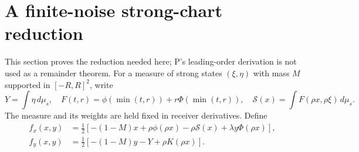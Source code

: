 \documentclass[11pt]{article}
\theoremstyle{remark}\newtheorem{remark}[theorem]{Remark}
\newcommand{\dd}{\,d}
\begin{document}
\section{A finite-noise strong-chart reduction}
This section proves the reduction needed here; P's leading-order
derivation is not used as a remainder theorem.
For a measure of strong states $(\xi,\eta)$ with mass $M$ supported
in $[-R,R]^2$, write
\[
 Y=\int\eta\dd\mu_s,\quad
 F(t,r)=\phi(\min(t,r))+r\Phi(\min(t,r)),\quad
 \mathcal S(x)=\int F(\rho x,\rho\xi)\dd\mu_s .
\]
The measure and its weights are held fixed in receiver derivatives.
Define
\begin{align}
 f_x(x,y)&=\tfrac12[-(1-M)x+\rho\phi(\rho x)
                         -\rho\mathcal S(x)+\lambda y\Phi(\rho x)],
 \nonumber\\
 f_y(x,y)&=\tfrac12[-(1-M)y-Y+\rho K(\rho x)].
 \label{an02momcv1:leadingfield}
\end{align}
\end{document}
